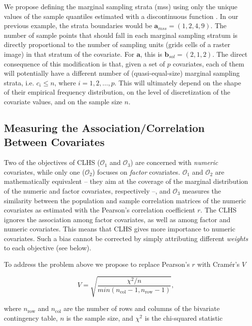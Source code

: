 We propose defining the marginal sampling strata (mss) using only the unique values of the sample quantiles 
estimated with a discontinuous function \cite{HyndmanEtAl1996}. In our previous example, the strata boundaries 
would be $\boldsymbol{a}_{mss} = (1, 2, 4, 9)$. The number of sample points that should fall in each marginal 
sampling stratum is directly proportional to the number of sampling units (grids cells of a raster image) in 
that stratum of the covariate. For $\boldsymbol{a}$, this is $\boldsymbol{b}_{sol} = (2, 1, 2)$. The direct 
consequence of this modification is that, given a set of $p$ covariates, each of them will potentially have a 
different number of (quasi-equal-size) marginal sampling strata, i.e. $c_i \leq n$, where $i = 1, 2, \ldots, 
p$. This will ultimately depend on the shape of their empirical frequency distribution, on the level of 
discretization of the covariate values, and on the sample size $n$.

\subsection{Measuring the Association/Correlation Between Covariates}

Two of the objectives of CLHS ($\mathcal{O}_1$ and $\mathcal{O}_3$) are concerned with \emph{numeric} 
covariates, while only one ($\mathcal{O}_2$) focuses on \emph{factor} covariates. $\mathcal{O}_1$ and 
$\mathcal{O}_2$ are mathematically equivalent -- they aim at the coverage of the marginal distribution of the 
numeric and factor covariates, respectively --, and $\mathcal{O}_3$ measures the similarity between the 
population and sample correlation matrices of the numeric covariates as estimated with the Pearson's 
correlation coefficient $r$. The CLHS ignores the association among factor covariates, as well as among factor 
and numeric covariates. This means that CLHS gives more importance to numeric covariates. Such a bias cannot be 
corrected by simply attributing different \emph{weights} to each objective (see below).

To address the problem above we propose to replace Pearson's $r$ with Cramér's $V$

\begin{equation}\label{eqn:chap08-cramer}
 V =  \sqrt{\frac{\chi^2 / n}{min(n_\text{col} - 1, n_\text{row} - 1)}},
\end{equation}

\noindent where $n_\text{row}$ and $n_\text{col}$ are the number of rows and columns of the bivariate 
contingency table, $n$ is the sample size, and $\chi^2$ is the chi-squared statistic

